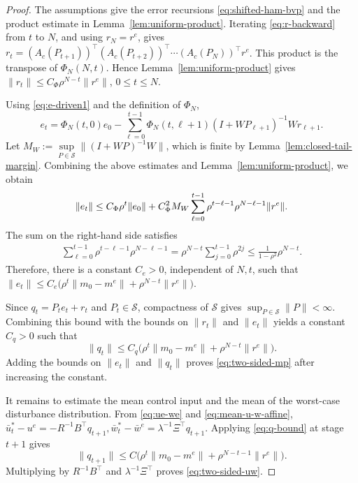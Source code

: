 \documentclass[10pt,journal,twoside]{IEEEtran}
\theoremstyle{definition}
\theoremstyle{remark}
\begin{document}
\begin{proof}
	The assumptions give the error recursions
	\eqref{eq:shifted-ham-bvp} and the product estimate in
	Lemma~\ref{lem:uniform-product}.
	Iterating \eqref{eq:r-backward} from \(t\) to \(N\), and using
	\(r_N=r^e\), gives
	$r_t
		=
		(A_c(P_{t+1}))^\top
		(A_c(P_{t+2}))^\top
		\cdots      
		(A_c(P_N))^\top r^e$.
	This product is the transpose of \(\Phi_N(N,t)\). Hence
	Lemma~\ref{lem:uniform-product} gives
	$\|r_t\|
		\le
		C_\Phi\rho^{N-t}\|r^e\|$, $0\le t\le N$.
        
Using \eqref{eq:e-driven1} and the definition of \(\Phi_N\),
	\begin{equation*}
			e_t
			=
			\Phi_N(t,0)e_0 -
			\sum_{\ell=0}^{t-1}
			\Phi_N(t,\ell+1)
			(I+WP_{\ell+1})^{-1}
			Wr_{\ell+1} .
	\end{equation*}
	Let
	$M_W:=\underset{P\in\mathscr S}{\sup}\|(I+WP)^{-1}W\|$,
	which is finite by Lemma~\ref{lem:closed-tail-margin}. Combining the above estimates and
	Lemma~\ref{lem:uniform-product}, we obtain
	\begin{align*}
		\|e_t\|
		\le
		C_\Phi\rho^t\|e_0\|
		\notag+
		C_\Phi^2M_W
		\sum_{\ell=0}^{t-1}
		\rho^{t-\ell-1}
		\rho^{N-\ell-1}
		\|r^e\|.
	\end{align*}
	The sum on the right-hand side satisfies
	\[
	\begin{aligned}
		\sum_{\ell=0}^{t-1}
		\rho^{t-\ell-1}
		\rho^{N-\ell-1}
		=
		\rho^{N-t}
		\sum_{j=0}^{t-1}\rho^{2j}\le
		\frac{1}{1-\rho^2}
		\rho^{N-t}.
	\end{aligned}
	\]
	Therefore, there is a constant \(C_e>0\), independent of \(N,t\), such
	that $\|e_t\|\le C_e\Big(\rho^t\|m_0-m^e\|+\rho^{N-t}\|r^e\|\Big)$.
	
	Since \(q_t=P_te_t+r_t\) and
	\(P_t\in\mathscr S\), compactness of \(\mathscr S\) gives
	\(
	\sup_{P\in\mathscr S}\|P\|<\infty .
	\)
	Combining this bound with the bounds on $\|r_t\|$ and $\|e_t\|$
	yields a constant \(C_q>0\) such that
	\begin{equation}
		\|q_t\|
		\le
		C_q
		\Big(
		\rho^t\|m_0-m^e\|
		+
		\rho^{N-t}\|r^e\|
		\Big).
		\label{eq:q-bound}
	\end{equation}
	Adding the bounds on $\|e_t\|$ and $\|q_t\|$ proves \eqref{eq:two-sided-mp} after increasing the
	constant.
	
	It remains to estimate the mean control input and the mean of the
worst-case disturbance distribution.
	From \eqref{eq:ue-we} and \eqref{eq:mean-u-w-affine},
	\(
	\bar{u}_t^*-u^e
	=
	-R^{-1}B^\top q_{t+1},
	\bar{w}_t^*-\bar w^e
	=
	\lambda^{-1}\Xi^\top q_{t+1} .
	\)
	Applying \eqref{eq:q-bound} at stage \(t+1\) gives
	$$
		\|q_{t+1}\|
		\le
		C
		\Big(
		\rho^t\|m_0-m^e\|
		+
		\rho^{N-t-1}\|r^e\|
		\Big).
    $$
	Multiplying by  \(R^{-1}B^\top\) and
	\(\lambda^{-1}\Xi^\top\) proves \eqref{eq:two-sided-uw}.
\end{proof}
\end{document}
